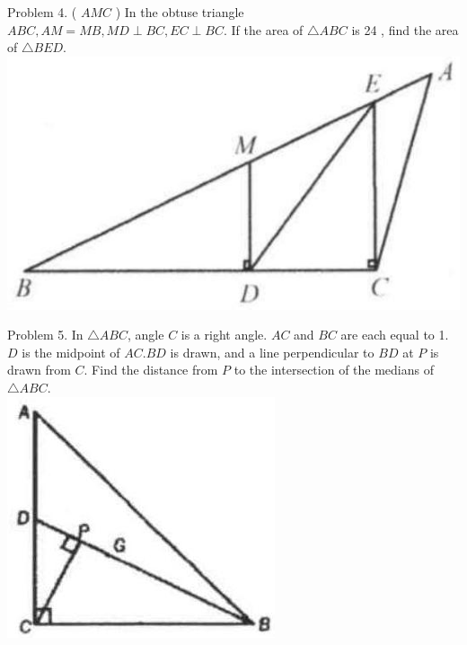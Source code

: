\documentclass[10pt]{article}
\begin{document}
Problem 4. ( \(A M C\) ) In the obtuse triangle \(A B C, A M=M B, M D \perp B C, E C \perp B C\). If the area of \(\triangle A B C\) is 24 , find the area of \(\triangle B E D\).\\
\includegraphics[max width=\textwidth, center]{2025_04_17_97bc1f7e44d93c271a88g-015}


Problem 5. In \(\triangle A B C\), angle \(C\) is a right angle. \(A C\) and \(B C\) are each equal to 1. \(D\) is the midpoint of \(A C . B D\) is drawn, and a line perpendicular to \(B D\) at \(P\) is drawn from \(C\). Find the distance from \(P\) to the intersection of the medians of \(\triangle A B C\).\\
\includegraphics[max width=\textwidth, center]{2025_04_17_97bc1f7e44d93c271a88g-016(4)}
\end{document}
